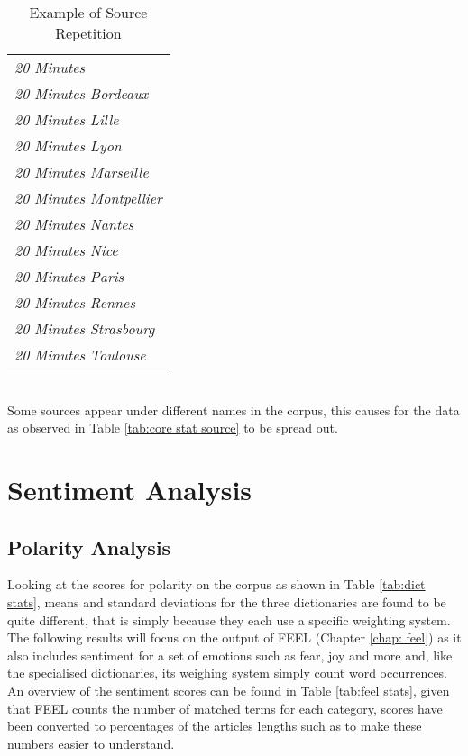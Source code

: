 \begin{table}[]
\caption{Example of Source Repetition}
\label{tab:source repetition}
\centering
\begin{tabular}{l}
\toprule
\emph{20 Minutes} \\
\emph{20 Minutes Bordeaux} \\
\emph{20 Minutes Lille} \\
\emph{20 Minutes Lyon} \\
\emph{20 Minutes Marseille} \\
\emph{20 Minutes Montpellier} \\
\emph{20 Minutes Nantes} \\
\emph{20 Minutes Nice} \\
\emph{20 Minutes Paris} \\
\emph{20 Minutes Rennes} \\
\emph{20 Minutes Strasbourg} \\
\emph{20 Minutes Toulouse} \\
\bottomrule
\end{tabular} \\[0.2cm]
Some sources appear under different names in the corpus, this causes for the data as observed in Table \ref{tab:core stat source} to be spread out.
\end{table}

\section{Sentiment Analysis}

\subsection{Polarity Analysis}

Looking at the scores for polarity on the corpus as shown in Table \ref{tab:dict stats}, means and standard deviations for the three dictionaries are found to be quite different, that is simply because they each use a specific weighting system. The following results will focus on the output of FEEL (Chapter \ref{chap: feel}) as it also includes sentiment for a set of emotions such as fear, joy and more and, like the specialised dictionaries, its weighing system simply count word occurrences. An overview of the sentiment scores can be found in Table \ref{tab:feel stats}, given that FEEL counts the number of matched terms for each category, scores have been converted to percentages of the articles lengths such as to make these numbers easier to understand. 

